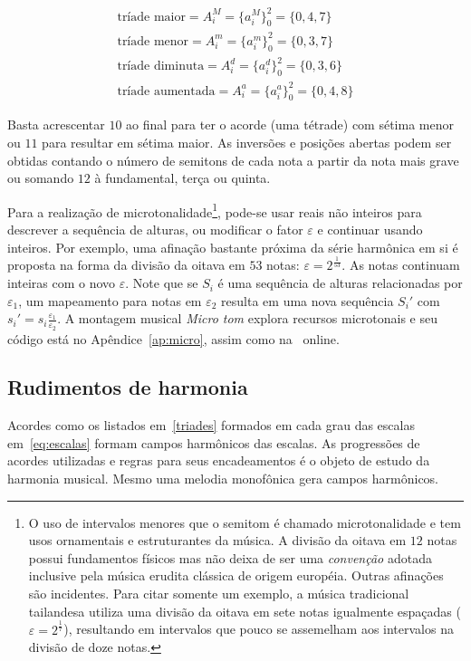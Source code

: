 \begin{equation}\label{triades}
\begin{split}
\text{tríade maior} = A_i^M= \{a_i^M\}_0^2=\{0,4,7\} \\ 
\text{tríade menor} = A_i^m = \{a_i^m\}_0^2=\{0,3,7\} \\
\text{tríade diminuta} = A_i^d = \{a_i^d\}_0^2=\{0,3,6\} \\
\text{tríade aumentada} = A_i^a = \{a_i^a\}_0^2=\{0,4,8\}
\end{split}
\end{equation}

Basta acrescentar $10$ ao final para ter o acorde (uma tétrade)
com sétima menor ou $11$ para resultar em sétima maior. As inversões e posições abertas
podem ser obtidas contando o número de semitons de cada nota a partir da nota mais grave ou somando $12$ à fundamental, terça ou quinta.

Para a realização de microtonalidade\footnote{O uso de
intervalos menores que o semitom é chamado microtonalidade e tem usos
ornamentais e estruturantes da música. A
divisão da oitava em $12$ notas possui fundamentos físicos mas
não deixa de ser uma \emph{convenção}
adotada inclusive pela música erudita clássica de origem européia. Outras afinações
são incidentes. Para citar somente um exemplo, a
música tradicional tailandesa utiliza uma divisão da oitava em sete notas igualmente
espaçadas ($\varepsilon=2^{\frac{1}{7}}$),
resultando em intervalos que pouco se assemelham aos intervalos na
divisão de doze notas.\cite{Wisnick}},
pode-se usar reais não inteiros
para descrever a sequência de alturas, ou modificar o fator $\varepsilon$
e continuar usando inteiros. Por exemplo, uma afinação
bastante próxima da série harmônica em si
é proposta na forma da divisão da oitava em $53$ notas:
$\varepsilon=2^{\frac{1}{53}}$.\cite{microtonalidade}
As notas
continuam inteiras com o novo $\varepsilon$.
Note que se $S_i$ é uma sequência de alturas relacionadas por $\varepsilon_1$,
um mapeamento para notas em $\varepsilon_2$
resulta em uma nova sequência $S_i'$ com $s_i'=s_i \frac{\varepsilon_1}{\varepsilon_2}$. A montagem musical \emph{Micro tom} explora recursos microtonais e seu código está no Apêndice~\ref{ap:micro}, assim como na \massa\ online.


\subsection{Rudimentos de harmonia}

Acordes como os listados em~\ref{triades} formados em cada
grau das escalas em~\ref{eq:escalas} formam campos harmônicos
das escalas. As progressões de acordes utilizadas e regras para seus encadeamentos é o objeto de estudo da harmonia musical.
Mesmo uma melodia monofônica gera campos harmônicos.

